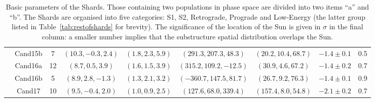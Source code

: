 \begin{table}[t!]
\begin{tabularx}{0.98\textwidth}{cc|ccccccc}
& Cand15b  & 7         & $(10.3,-0.3,2.4)$ & $(1.8,2.3,5.9)$                      & $(291.3,207.3,48.3)$     & $(20.2,10.4,68.7)$                & $-1.4\pm 0.1$ & 0.5 \\
& Cand16a  & 12        & $(8.7,0.5,3.9)$   & $(1.6,1.5,3.9)$                      & $(315.2,109.2,-12.5)$    & $(30.9,4.6,67.2)$                 & $-1.4\pm 0.2$ & 0.7 \\
& Cand16b  & 5         & $(8.9,2.8,-1.3)$  & $(1.3,2.1,3.2)$                      & $(-360.7,147.5,81.7)$    & $(26.7,9.2,76.3)$                 & $-1.4\pm 0.1$ & 0.9 \\
& Cand17   & 10        & $(9.5,-0.4,2.0)$  & $(1.0,0.9,2.5)$                      & $(127.6,68.0,339.4)$     & $(157.4,8.0,54.8)$                & $-2.1\pm 0.2$ & 0.7 \\
\hline\hline
 \end{tabularx}
\caption{Basic parameters of the Shards. 
Those containing two populations in phase space are divided into two items ``a'' and ``b''. The Shards are
  organised into five categories: S1, S2, Retrograde, Prograde and
  Low-Energy (the latter group listed in Table~\ref{tab:restofshards}
  for brevity). The significance of the location of the Sun is given
  in $\sigma$ in the final column: a smaller number implies that
  the substructure spatial distribution overlaps the Sun.}
\label{tab:shards}
\end{table}
